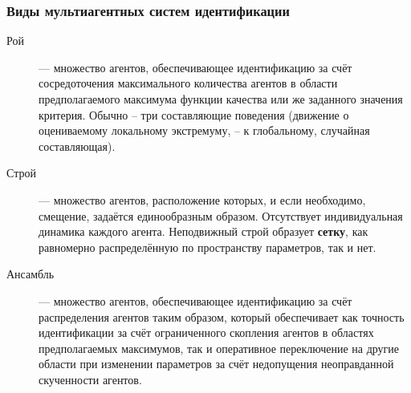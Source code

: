 \documentclass[10pt,utf8]{beamer}
\begin{document}
\begin{frame}
  \frametitle{Виды мультиагентных систем идентификации}

  \begin{description}
    \item[Рой]
      --- множество агентов, обеспечивающее идентификацию за счёт
      сосредоточения максимального количества агентов
      в области предполагаемого максимума функции качества или же
      заданного значения критерия.
      Обычно -- три составляющие поведения
      (движение о оцениваемому локальному экстремуму, -- к глобальному, случайная составляющая).

    \item[Строй]
      --- множество агентов, расположение которых,
      и если необходимо, смещение, задаётся
      единообразным образом.
      Отсутствует индивидуальная динамика каждого агента.
      Неподвижный строй образует \textbf{сетку},
      как равномерно распределённую по пространству параметров,
      так и нет.

    \item[Ансамбль]
      --- множество агентов, обеспечивающее идентификацию за счёт
      распределения агентов таким образом, который обеспечивает как
      точность идентификации за счёт ограниченного скопления агентов
      в областях предполагаемых максимумов, так и оперативное переключение
      на другие области при изменении параметров за счёт недопущения
      неоправданной скученности агентов.
   \end{description}

\end{frame}



\end{document}
